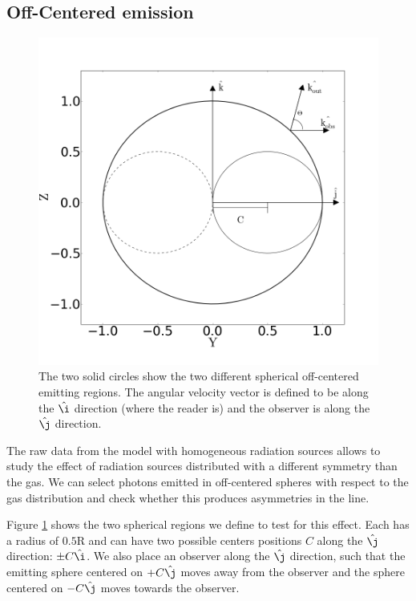 \documentclass{emulateapj}
\begin{document}
\subsection{Off-Centered emission}
\label{sec:off-center}
\begin{figure}
  \includegraphics[scale=0.3]{OF_spheres.png}
  \caption{The two solid circles show the two different spherical
    off-centered emitting  regions. The angular velocity vector is
    defined to be along the $\hat{\i}$ direction (where the reader is) 
    and the observer is along the $\hat{\j}$ direction. 
    \label{fig:OCspheres}} 
\end{figure}

The raw data from the model with homogeneous radiation sources allows
to study the effect of radiation sources distributed with a different
symmetry than the gas. We can select photons emitted in off-centered spheres 
with respect to the gas distribution and check whether this produces
asymmetries in the line.


Figure \ref{fig:OCspheres} shows the two spherical regions we
define to test for this effect. Each has a radius of $0.5$R and can
have two possible centers positions $C$ along the $\hat{\j}$ direction:
$\pm C\hat{\i}$. We also place an observer along the $\hat{\j}$
direction, such that the emitting sphere centered on $+C\hat{\j}$ moves
away from the observer and the sphere centered on $-C\hat{\j}$ moves
towards the observer. 
\end{document}

